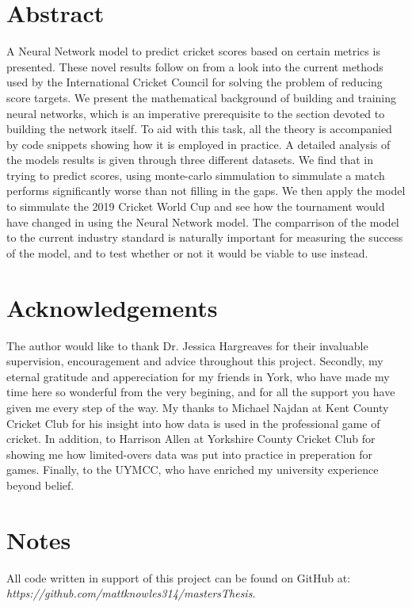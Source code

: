 \documentclass[11pt]{report}
\begin{document}


\section*{Abstract}
A Neural Network model to predict cricket scores based on certain metrics is presented. These novel results follow on from a look into the current methods used by the International 
Cricket Council for solving the problem of reducing score targets. We present the mathematical background of building and training neural networks, which is an imperative prerequisite to the section devoted
to building the network itself. To aid with this task, all the theory is accompanied by code snippets showing how it is employed in practice. A detailed analysis of the models results is given through three different
datasets. We find that in trying to predict scores, using monte-carlo simmulation to simmulate a match performs significantly worse than not filling in the gaps. We then apply the model to simmulate the 2019 Cricket 
World Cup and see how the tournament would have changed in using the Neural Network model. The comparrison of the model to the current industry standard is naturally important for measuring the success of the model, 
and to test whether or not it would be viable to use instead. 

\section*{Acknowledgements}
The author would like to thank Dr. Jessica Hargreaves for their invaluable supervision, encouragement and advice throughout this project. Secondly, my eternal gratitude and appereciation for my friends in York, who have made my time here so wonderful from the very begining, and for all the support you have given me every step of the way. 
My thanks to Michael Najdan at Kent County Cricket Club for his insight into how data is used in the professional game of cricket. In addition, to Harrison Allen at Yorkshire County Cricket Club for showing me how limited-overs data was put into practice in preperation for games.
Finally, to the UYMCC, who have enriched my university experience beyond belief. 


\section*{Notes}
All code written in support of this project can be found on GitHub at: \\
\textit{https://github.com/mattknowles314/mastersThesis}.
\end{document}
